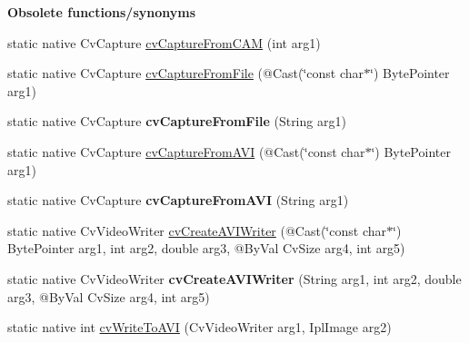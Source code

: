 \begin{Indent}\textbf{ Obsolete functions/synonyms}\par
\begin{DoxyCompactItemize}
\item 
static native Cv\+Capture \hyperlink{group__videoio__c_gafab92effdc81a1a2eb305dc69eb84bfd}{cv\+Capture\+From\+C\+AM} (int arg1)
\item 
static native Cv\+Capture \hyperlink{group__videoio__c_ga5fccc51ced33519e61c5687ca7b17fdb}{cv\+Capture\+From\+File} (@Cast(\char`\"{}const char$\ast$\char`\"{}) Byte\+Pointer arg1)
\item 
static native Cv\+Capture {\bfseries cv\+Capture\+From\+File} (String arg1)
\item 
static native Cv\+Capture \hyperlink{group__videoio__c_ga153463bfe93115b2ff7783a8c504d2a7}{cv\+Capture\+From\+A\+VI} (@Cast(\char`\"{}const char$\ast$\char`\"{}) Byte\+Pointer arg1)
\item 
static native Cv\+Capture {\bfseries cv\+Capture\+From\+A\+VI} (String arg1)
\item 
static native Cv\+Video\+Writer \hyperlink{group__videoio__c_ga7ac706f58e712a321ff4ed14d9c98dfc}{cv\+Create\+A\+V\+I\+Writer} (@Cast(\char`\"{}const char$\ast$\char`\"{}) Byte\+Pointer arg1, int arg2, double arg3, @By\+Val Cv\+Size arg4, int arg5)
\item 
static native Cv\+Video\+Writer {\bfseries cv\+Create\+A\+V\+I\+Writer} (String arg1, int arg2, double arg3, @By\+Val Cv\+Size arg4, int arg5)
\item 
static native int \hyperlink{group__videoio__c_ga3f795024cbed8966f3b006b1ccd99acc}{cv\+Write\+To\+A\+VI} (Cv\+Video\+Writer arg1, Ipl\+Image arg2)
\end{DoxyCompactItemize}
\end{Indent}
